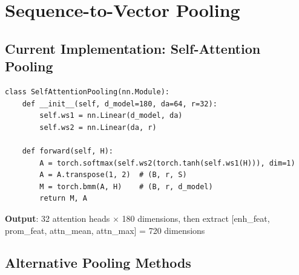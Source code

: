 \documentclass[11pt,a4paper]{article}
\begin{document}
\section{Sequence-to-Vector Pooling}

\subsection{Current Implementation: Self-Attention Pooling}

\begin{verbatim}
class SelfAttentionPooling(nn.Module):
    def __init__(self, d_model=180, da=64, r=32):
        self.ws1 = nn.Linear(d_model, da)
        self.ws2 = nn.Linear(da, r)
    
    def forward(self, H):
        A = torch.softmax(self.ws2(torch.tanh(self.ws1(H))), dim=1)
        A = A.transpose(1, 2)  # (B, r, S)
        M = torch.bmm(A, H)    # (B, r, d_model)
        return M, A
\end{verbatim}

\textbf{Output}: 32 attention heads $\times$ 180 dimensions, then extract [enh\_feat, prom\_feat, attn\_mean, attn\_max] = 720 dimensions

\subsection{Alternative Pooling Methods}
\end{document}
